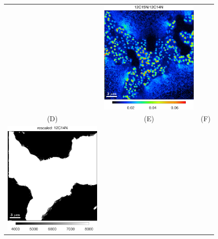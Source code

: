 \begin{figure}[!ht]
\begin{tabular}{ccc}
&
\includegraphics[scale=0.4, valign=t]{figs6/12C15N-12C14N}
\\
(D) & (E) & (F) \\
\includegraphics[scale=0.4, valign=t]{figs6/12C14Nb}

\end{tabular}
\end{figure}
